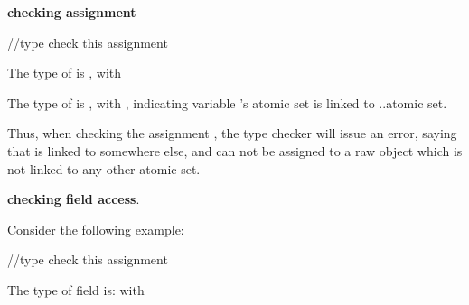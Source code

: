 \documentclass{article}
\begin{document}
\begin{enumerate}

\Item \textbf{checking assignment}


\hspace{3mm}

\hspace{6mm}

\hspace{6mm}

\hspace{6mm} //type check this assignment

\hspace{3mm} \CodeIn{\}}

\CodeIn{\}}



The type of  is , with 

The type of  is , with , indicating variable 's atomic set is linked to ..atomic set.

Thus, when checking the assignment , the type checker will issue an error, saying that  is linked to somewhere else, and can not be assigned to a raw object  which is not linked to any other atomic set.

\Item \textbf{checking field access}.

Consider the following example:


\hspace{3mm}

\CodeIn{\}}


\hspace{3mm}

\hspace{6mm}

\hspace{6mm} //type check this assignment

\hspace{3mm} \CodeIn{\}}

\CodeIn{\}}

The type of  field is:  with 


\end{enumerate}
\end{document}
